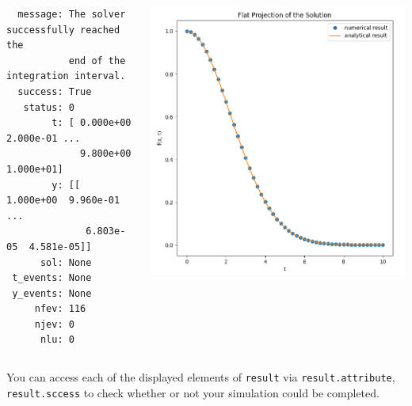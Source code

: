 %
\begin{frame}[fragile]
%
\begin{columns}
\begin{cmdbox}[Output: First Order ODE:  $y' {=} \alpha \cdot t \cdot y$]
\begin{verbatim}
  message: The solver successfully reached the 
           end of the integration interval.
  success: True
   status: 0
        t: [ 0.000e+00  2.000e-01 ...  
             9.800e+00  1.000e+01]
        y: [[ 1.000e+00  9.960e-01 ...  
              6.803e-05  4.581e-05]]
      sol: None
 t_events: None
 y_events: None
     nfev: 116
     njev: 0
      nlu: 0
\end{verbatim}
\end{cmdbox}
%
\includegraphics[width=\linewidth]{./gfx/04-ODE-solution}
\end{columns}
%
\vspace{-3pt}
\begin{hintbox}
\footnotesize
You can access each of the displayed elements of \texttt{result} via \texttt{result.attribute}, \zB \texttt{result.sccess} to check whether or not your simulation could be completed.
\end{hintbox}
%
\end{frame}

